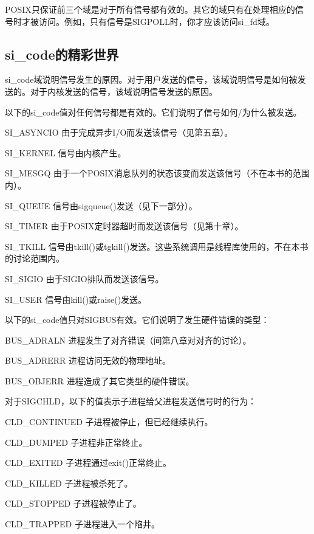 POSIX只保证前三个域是对于所有信号都有效的。其它的域只有在处理相应的信号时才被访问。例如，只有信号是SIGPOLL时，你才应该访问si\_fd域。

\subsection{si\_code的精彩世界}

si\_code域说明信号发生的原因。对于用户发送的信号，该域说明信号是如何被发送的。对于内核发送的信号，该域说明信号发送的原因。

以下的si\_code值对任何信号都是有效的。它们说明了信号如何/为什么被发送。

\begin{eqlist*}
\item[SI\_ASYNCIO] 由于完成异步I/O而发送该信号（见第五章）。
\item[SI\_KERNEL] 信号由内核产生。
\item[SI\_MESGQ] 由于一个POSIX消息队列的状态该变而发送该信号（不在本书的范围内）。
\item[SI\_QUEUE] 信号由sigqueue()发送（见下一部分）。
\item[SI\_TIMER] 由于POSIX定时器超时而发送该信号（见第十章）。
\item[SI\_TKILL] 信号由tkill()或tgkill()发送。这些系统调用是线程库使用的，不在本书的讨论范围内。
\item[SI\_SIGIO] 由于SIGIO排队而发送该信号。
\item[SI\_USER] 信号由kill()或raise()发送。
\end{eqlist*}

以下的si\_code值只对SIGBUS有效。它们说明了发生硬件错误的类型：

\begin{eqlist*}
\item[BUS\_ADRALN] 进程发生了对齐错误（间第八章对对齐的讨论）。
\item[BUS\_ADRERR] 进程访问无效的物理地址。
\item[BUS\_OBJERR] 进程造成了其它类型的硬件错误。
\end{eqlist*}

 对于SIGCHLD，以下的值表示子进程给父进程发送信号时的行为：

\begin{eqlist*}
\item[CLD\_CONTINUED] 子进程被停止，但已经继续执行。
\item[CLD\_DUMPED] 子进程非正常终止。
\item[CLD\_EXITED] 子进程通过exit()正常终止。
\item[CLD\_KILLED] 子进程被杀死了。
\item[CLD\_STOPPED] 子进程被停止了。
\item[CLD\_TRAPPED] 子进程进入一个陷井。
\end{eqlist*}

